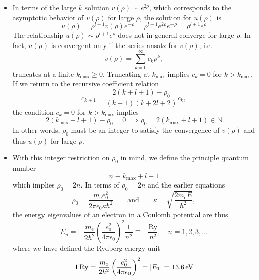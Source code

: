 \documentclass[11pt, a4paper]{article}
\newcommand{\eqtext}[1]{\qquad \text{#1} \qquad}
\begin{document}
\begin{itemize}
	\item In terms of the large $ k $ solution $ v(\rho) \sim e^{2\rho} $, which corresponds to the asymptotic behavior of $ v(\rho) $ for large $ \rho $, the solution for $ u(\rho) $ is
	\begin{equation*}
		u(\rho) = \rho^{l+1}v(\rho)e^{-\rho} = \rho^{l+1}e^{2\rho}e^{-\rho} =  \rho^{l+1}e^{\rho}
	\end{equation*}
	The relationship $ u(\rho) \sim \rho^{l+1}e^{\rho} $ does not in general converge for large $ \rho $. In fact, $ u(\rho) $ is convergent only if the series ansatz for $ v(\rho) $, i.e.
	\begin{equation*}
		v(\rho) = \sum_{k = 0}^{\infty}c_{k}\rho^{k},
	\end{equation*}
	truncates at a finite $ k_{\text{max}} \geq 0 $. Truncating at $ k_{\text{max}} $ implies $ c_{k} = 0 $ for $ k > k_{\text{max}} $. If we return to the recursive coefficient relation
	\begin{equation*}
		c_{k+1} = \frac{2(k+l+1)-\rho_{0}}{(k+1)(k+2l + 2)}c_{k},
	\end{equation*}
	the condition $ c_{k} = 0 $ for $ k > k_{\text{max}} $ implies
	\begin{equation*}
		2(k_{\text{max}} + l + 1) - \rho_{0} = 0 \implies \rho_{0} = 2(k_{\text{max}} + l + 1) \in \mathbb{N}
	\end{equation*}
	In other words, $ \rho_{0} $ must be an integer to satisfy the convergence of $ v(\rho) $ and thus $ u(\rho) $ for large $ \rho $. 
	
	\item With this integer restriction on $ \rho_{0} $ in mind, we define the principle quantum number
	\begin{equation*}
		n \equiv k_{\text{max}} + l + 1
	\end{equation*}
	which implies $ \rho_{0} = 2n $. In terms of $ \rho_{0} = 2n $ and the earlier equations
	\begin{equation*}
		\rho_{0} = \frac{m_{\text{e}}e_{0}^{2}}{2\pi \epsilon_{0}\kappa \hbar^{2}} \eqtext{and} \kappa = \sqrt{\frac{2m_{\text{e}}E}{\hbar^{2}}},
	\end{equation*}
	the energy eigenvalues of an electron in a Coulomb potential are thus
	\begin{equation*}
		E_{n} = - \frac{m_{\text{e}}}{2\hbar^{2}}\left(\frac{e_{0}^{2}}{4\pi \epsilon_{0}}\right)^{2}\frac{1}{n^{2}} \equiv - \frac{\text{Ry}}{n^{2}}, \quad n = 1, 2, 3, \ldots
	\end{equation*}
	where we have defined the Rydberg energy unit
	\begin{equation*}
		\SI{1}{Ry} = \frac{m_{\text{e}}}{2\hbar^{2}}\left(\frac{e_{0}^{2}}{4\pi \epsilon_{0}}\right)^{2} = \abs{E_{1}} = \SI{13.6}{\electronvolt}
	\end{equation*}
\end{itemize}
\end{document}
